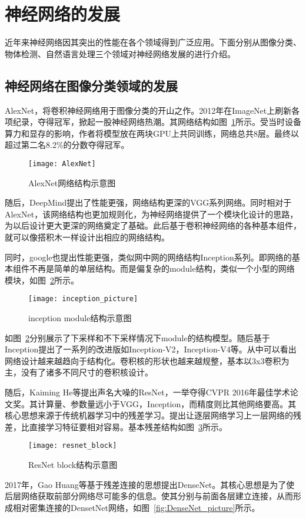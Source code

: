 \section{神经网络的发展}
近年来神经网络因其突出的性能在各个领域得到广泛应用。下面分别从图像分类、物体检测、自然语言处理三个领域对神经网络发展的进行介绍。
\subsection{神经网络在图像分类领域的发展}
AlexNet，将卷积神经网络用于图像分类的开山之作。2012年在ImageNet上刷新各项纪录，夺得冠军，掀起一股神经网络热潮。其网络结构如图~\ref{fig:AlexNet}所示。受当时设备算力和显存的影响，作者将模型放在两块GPU上共同训练，网络总共8层。最终以超过第二名8.2\%的分数夺得冠军。

\begin{figure}[htp]
\centering
\texttt{[image: AlexNet]}
\caption{AlexNet网络结构示意图}
\label{fig:AlexNet}
\end{figure}
随后，DeepMind提出了性能更强，网络结构更深的VGG系列网络。同时相对于AlexNet，该网络结构也更加规则化，为神经网络提供了一个模块化设计的思路，为以后设计更大更深的网络奠定了基础。此后基于卷积神经网络的各种基本组件，就可以像搭积木一样设计出相应的网络结构。

同时，google也提出性能更强，类似网中网的网络结构Inception系列。即网络的基本组件不再是简单的单层结构。而是偏复杂的module结构，类似一个小型的网络模块，如图~\ref{fig:inception_picture}所示。

\begin{figure}[htp]
\centering
\texttt{[image: inception\_picture]}
\caption{inception module结构示意图}
\label{fig:inception_picture}
\end{figure}
如图~\ref{fig:inception_picture}分别展示了下采样和不下采样情况下module的结构模型。随后基于Inception提出了一系列的改进版如Inception-V2，Inception-V4等。从中可以看出网络设计越来越趋向于结构化。卷积核的形状也越来越规整，基本以3x3卷积为主，没有了诸多不同尺寸的卷积核设计。

随后，Kaiming He等提出声名大噪的ResNet，一举夺得CVPR 2016年最佳学术论文奖。其计算量、参数量远小于VGG，Inception，而精度则比其他网络要高。其核心思想来源于传统机器学习中的残差学习。提出让逐层网络学习上一层网络的残差，比直接学习特征要相对容易。基本残差结构如图~\ref{fig:resnet_block}所示。

\begin{figure}[htp]
\centering
\texttt{[image: resnet\_block]}
\caption{ResNet block结构示意图}
\label{fig:resnet_block}
\end{figure}
2017年，Gao Huang等基于残差连接的思想提出DenseNet。其核心思想是为了使后层网络获取前部分网络尽可能多的信息。使其分别与前面各层建立连接，从而形成相对密集连接的DensetNet网络，如图~\ref{fig:DenseNet_picture}所示。

